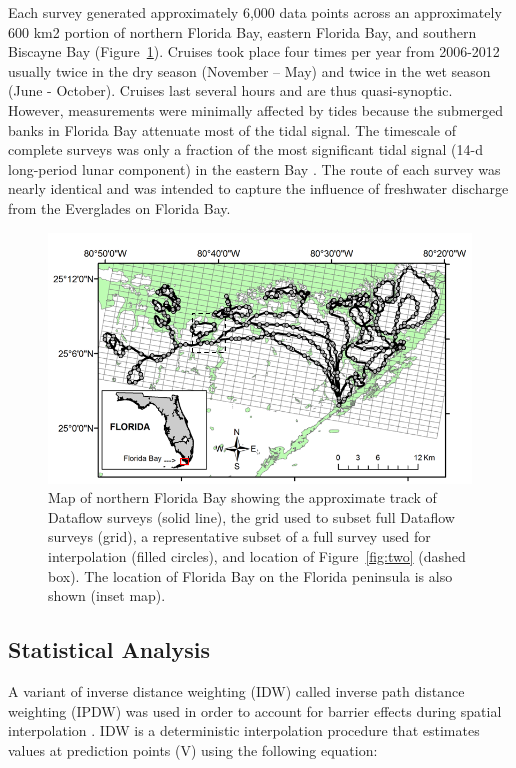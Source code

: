 \documentclass[shortnames,nofooter,noheadings]{jss}
\begin{document}
  Each survey generated approximately 6,000 data points across an approximately 600 km2 portion of northern Florida Bay, eastern Florida Bay, and southern Biscayne Bay (Figure~\ref{fig:one}). Cruises took place four times per year from 2006-2012 usually twice in the dry season (November – May) and twice in the wet season (June - October). Cruises last several hours and are thus quasi-synoptic. However, measurements were minimally affected by tides because the submerged banks in Florida Bay attenuate most of the tidal signal. The timescale of complete surveys was only a fraction of the most significant tidal signal (14-d long-period lunar component) in the eastern Bay \citep{wang1994wind}. The route of each survey was nearly identical and was intended to capture the influence of freshwater discharge from the Everglades on Florida Bay.
  
\begin{figure}[h]
\begin{center}
\includegraphics{sm-figure0.png}
\end{center}
\vspace{-20pt}
\caption{Map of northern Florida Bay showing the approximate track of Dataflow surveys (solid line), the grid used to subset full Dataflow surveys (grid),  a representative subset of a full survey used for interpolation (filled circles), and location of Figure~\ref{fig:two} (dashed box). The location of Florida Bay on the Florida peninsula is also shown (inset map).}
\label{fig:one}
\end{figure}
\FloatBarrier

\newpage
\subsection[Statistical Analysis]{Statistical Analysis}
\noindent A variant of inverse distance weighting (IDW) called inverse path distance weighting (IPDW) was used in order to account for barrier effects during spatial interpolation \citep{suominen2010surface}. IDW is a deterministic interpolation procedure that estimates values at prediction points (V) using the following equation:
\end{document}
